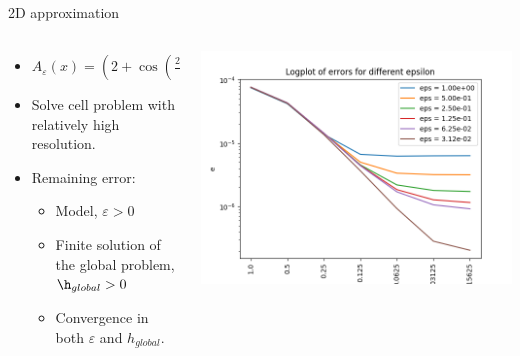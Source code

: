 \documentclass{beamer}
\renewcommand{\epsilon}{\varepsilon}
\begin{document}
\begin{frame}[t]{2D approximation}
  \begin{columns}
    \begin{column}[c]{.6\textwidth}
      \begin{itemize}
        \item
         $ A_\epsilon(x) =  \left( 2+\cos\left(\frac{2\pi(x+2y)}{\epsilon}\right) \right)^{-1}$
       \item Solve cell problem with relatively high resolution.
       \item Remaining error:
      \begin{itemize}
        \item Model, $\epsilon > 0$
        \item Finite solution of the global problem, $\h_{global} > 0$
        \item Convergence in both  $\epsilon$ and $h_{global}$.
       \end{itemize}
      \end{itemize}
    \end{column}
    \begin{column}[c]{.4\textwidth}  
      \includegraphics[width=0.9\linewidth]{2d_global_errors.png}      %
    \end{column}
  \end{columns}

\end{frame}
\end{document}
